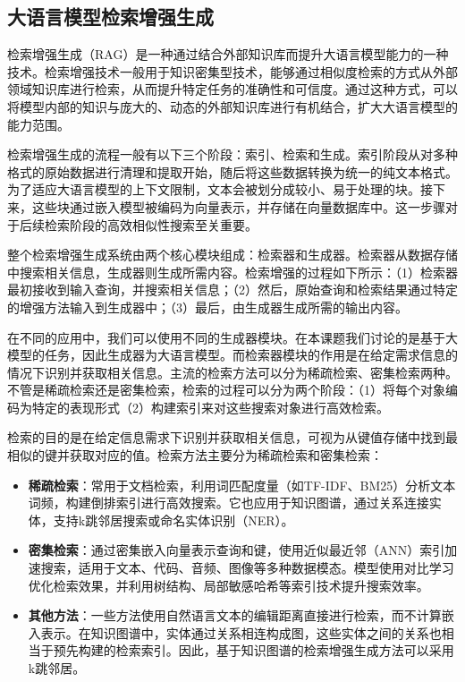 \subsection{大语言模型检索增强生成}
检索增强生成（RAG）是一种通过结合外部知识库而提升大语言模型能力的一种技术。检索增强技术一般用于知识密集型技术，能够通过相似度检索的方式从外部领域知识库进行检索，从而提升特定任务的准确性和可信度。通过这种方式，可以将模型内部的知识与庞大的、动态的外部知识库进行有机结合，扩大大语言模型的能力范围。

检索增强生成的流程一般有以下三个阶段：索引、检索和生成\cite{}。索引阶段从对多种格式的原始数据进行清理和提取开始，随后将这些数据转换为统一的纯文本格式。为了适应大语言模型的上下文限制，文本会被划分成较小、易于处理的块。接下来，这些块通过嵌入模型被编码为向量表示，并存储在向量数据库中。这一步骤对于后续检索阶段的高效相似性搜索至关重要。

整个检索增强生成系统由两个核心模块组成：检索器和生成器。检索器从数据存储中搜索相关信息，生成器则生成所需内容。检索增强的过程如下所示：（1）检索器最初接收到输入查询，并搜索相关信息；（2）然后，原始查询和检索结果通过特定的增强方法输入到生成器中；（3）最后，由生成器生成所需的输出内容。

在不同的应用中，我们可以使用不同的生成器模块。在本课题我们讨论的是基于大模型的任务，因此生成器为大语言模型。而检索器模块的作用是在给定需求信息的情况下识别并获取相关信息。主流的检索方法可以分为稀疏检索、密集检索两种。不管是稀疏检索还是密集检索，检索的过程可以分为两个阶段：（1）将每个对象编码为特定的表现形式（2）构建索引来对这些搜索对象进行高效检索。

检索的目的是在给定信息需求下识别并获取相关信息，可视为从键值存储中找到最相似的键并获取对应的值。检索方法主要分为稀疏检索和密集检索：

\begin{itemize}
    \item \textbf{稀疏检索}：常用于文档检索，利用词匹配度量（如TF-IDF、BM25）分析文本词频，构建倒排索引进行高效搜索。它也应用于知识图谱，通过关系连接实体，支持k跳邻居搜索或命名实体识别（NER）。
    \item \textbf{密集检索}：通过密集嵌入向量表示查询和键，使用近似最近邻（ANN）索引加速搜索，适用于文本、代码、音频、图像等多种数据模态。模型使用对比学习优化检索效果，并利用树结构、局部敏感哈希等索引技术提升搜索效率。
    \item \textbf{其他方法}：一些方法使用自然语言文本的编辑距离直接进行检索，而不计算嵌入表示。在知识图谱中，实体通过关系相连构成图，这些实体之间的关系也相当于预先构建的检索索引。因此，基于知识图谱的检索增强生成方法可以采用k跳邻居\cite{48,49}。
\end{itemize}

